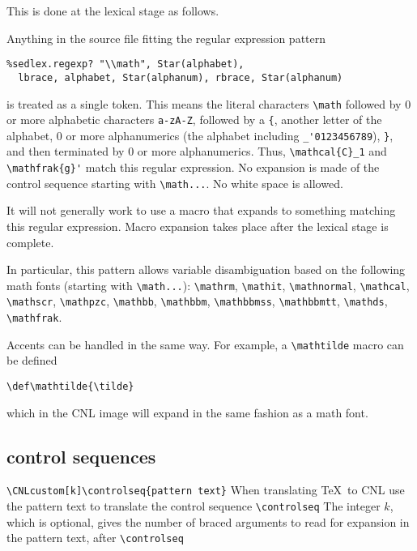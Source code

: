 \documentclass[12pt]{amsart}
\begin{document}
This is done at the lexical stage as follows.

Anything in the source file fitting the regular expression pattern
\begin{Verbatim}
%sedlex.regexp? "\\math", Star(alphabet), 
  lbrace, alphabet, Star(alphanum), rbrace, Star(alphanum) 
\end{Verbatim}
is treated as a single token.  This means the literal characters \verb!\math! followed by 0 or more alphabetic characters \verb!a-zA-Z!,
followed by a \verb!{!, another letter of the alphabet, 0 or more alphanumerics (the alphabet including \verb!_'0123456789!), \verb!}!, and then
terminated by 0 or more alphanumerics.   Thus, \verb!\mathcal{C}_1! and \verb!\mathfrak{g}'! match this regular expression.
No expansion is made of the control sequence starting with \verb!\math...!.  No white space is allowed.  

It will not generally work to use
a macro that expands to something
matching this regular expression.  Macro expansion takes place after the lexical stage is complete.

In particular, this pattern allows variable disambiguation based on the following math fonts (starting with \verb!\math...!):
\verb!\mathrm!, \verb!\mathit!, \verb!\mathnormal!, 
\verb!\mathcal!, \verb!\mathscr!, \verb!\mathpzc!, 
\verb!\mathbb!, \verb!\mathbbm!, \verb!\mathbbmss!, 
\verb!\mathbbmtt!, \verb!\mathds!, \verb!\mathfrak!.

Accents can be handled in the same way.  For example, a \verb!\mathtilde! macro
can be defined 

\verb!\def\mathtilde{\tilde}!

which in the CNL image will expand in the same fashion as a math font.





\subsection{control sequences}

\verb!\CNLcustom[k]\controlseq{pattern text}!   When translating \TeX\ to CNL use the pattern text to translate the control sequence \verb!\controlseq!
The integer $k$, which is optional, gives the number of braced arguments to read for expansion in the pattern text, after \verb!\controlseq!
\end{document}
